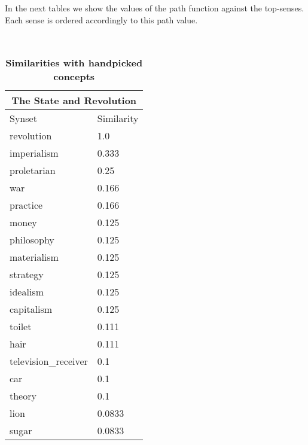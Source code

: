 
In the next tables we show the values of the path function against the top-senses. Each sense is ordered accordingly to this path value.
\begin{table*}[ht]
\caption*{\textbf{Similarities with handpicked concepts}}\\
\vspace{5px}
\begin{minipage}{5cm}
\begin{tabular}{ p{2.4cm} p{1.2cm} }
    \multicolumn{2}{c}{The State and Revolution}\\
    \toprule
    Synset & Similarity \\
    \midrule
          revolution &   1.0 \\
         imperialism & 0.333 \\
         proletarian &  0.25 \\
                 war & 0.166 \\
            practice & 0.166 \\
               money & 0.125 \\
          philosophy & 0.125 \\
         materialism & 0.125 \\
            strategy & 0.125 \\
            idealism & 0.125 \\
          capitalism & 0.125 \\
              toilet & 0.111 \\
                hair & 0.111 \\
 television\_receiver &   0.1 \\
                 car &   0.1 \\
              theory &   0.1 \\
                lion & 0.0833 \\
               sugar & 0.0833 \\    
    \bottomrule
\end{tabular}

\end{minipage}
\begin{minipage}{5cm}


\end{minipage}
\end{table*}
